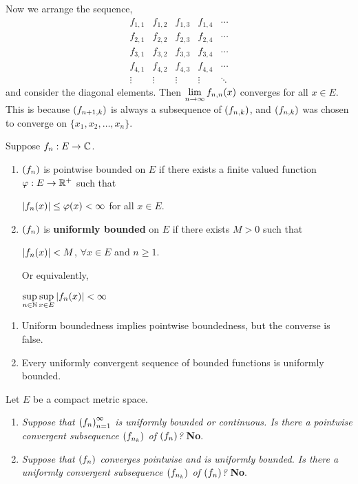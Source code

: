 Now we arrange the sequence,
\[
    \begin{matrix}
        f_{1, 1} & f_{1, 2} & f_{1, 3} & f_{1, 4} & \cdots \\
        f_{2, 1} & f_{2, 2} & f_{2, 3} & f_{2, 4} & \cdots \\
        f_{3, 1} & f_{3, 2} & f_{3, 3} & f_{3, 4} & \cdots \\
        f_{4, 1} & f_{4, 2} & f_{4, 3} & f_{4, 4} & \cdots \\
        \vdots   & \vdots   & \vdots   & \vdots   & \ddots
    \end{matrix}
\]
and consider the diagonal elements. Then \(\displaystyle \lim_{n \rightarrow \infty} f_{n, n}(x)\) converges for all \(x \in E\). This is because \(\left( f_{n+1, k} \right)\) is always a subsequence of \(\left( f_{n, k} \right)\), and \(\left( f_{n, k} \right)\) was chosen to converge on \(\{x_1, x_2, \dots, x_n\}\).

 Suppose \(f_n: E \rightarrow \mathbb{C}\).
\begin{enumerate}
    \item \(\left( f_n \right)\) is pointwise bounded on \(E\) if there exists a finite valued function \(\varphi: E \rightarrow \mathbb{R}^+\) such that
          \begin{center}
              \(\left| f_n(x) \right| \leq \varphi(x) < \infty\) for all \(x\in E\).
          \end{center}
    \item \(\left( f_n \right)\) is \textbf{uniformly bounded} on \(E\) if there exists \(M > 0\) such that
          \begin{center}
              \(\left| f_n(x) \right| < M\), \(\forall x \in E\) and \(n \geq 1\).
          \end{center}
          Or equivalently,
          \begin{center}
              \(\displaystyle \sup_{n\in \mathbb{N}} \sup_{x \in E} \left| f_n(x) \right| < \infty\)
          \end{center}
\end{enumerate}

\rmk
\begin{enumerate}
    \item Uniform boundedness implies pointwise boundedness, but the converse is false.
    \item Every uniformly convergent sequence of bounded functions is uniformly bounded.
\end{enumerate}

\medskip

\question Let \(E\) be a compact metric space.
\begin{enumerate}
    \item \textit{Suppose that \(\left( f_n \right)_{n=1}^\infty\) is uniformly bounded or continuous. Is there a pointwise convergent subsequence \(\left( f_{n_k} \right)\) of \(\left( f_n \right)\)?} \textbf{No}.
    \item \textit{Suppose that \(\left( f_n \right)\) converges pointwise and is uniformly bounded. Is there a uniformly convergent subsequence \(\left( f_{n_k} \right)\) of \(\left( f_n \right)\)?} \textbf{No}.
\end{enumerate}

